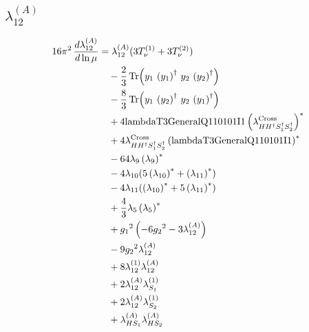 \documentclass[10pt,a4paper]{article}
\begin{document}
\subsection*{$\lambda_{12}^{(A)}$}
\begin{align*}
16\pi^2\,\frac{d \lambda_{12}^{(A)}}{d\ln\mu} &={\lambda_{12}^{(A)}} (3 T_{\nu}^{(1)}+3 T_{\nu}^{(2)}) \\
&\quad -\frac{2}{3} \operatorname{Tr}\!\left({y_1}\,\left({y_1}\right)^{\dagger}\,{y_2}\,\left({y_2}\right)^{\dagger}\right) \\
&\quad -\frac{8}{3} \operatorname{Tr}\!\left({y_1}\,\left({y_2}\right)^{\dagger}\,{y_2}\,\left({y_1}\right)^{\dagger}\right) \\
&\quad +4 \text{lambdaT3GeneralQ110101I1} \left({\lambda_{H H^\dagger S_1^\dagger S_2^\dagger}^{\rm Cross}}\right)^{*} \\
&\quad +4 {\lambda_{H H^\dagger S_1^\dagger S_2^\dagger}^{\rm Cross}} \left(\text{lambdaT3GeneralQ110101I1}\right)^{*} \\
&\quad -64 {\lambda_{9}} \left({\lambda_{9}}\right)^{*} \\
&\quad -4 {\lambda_{10}} (5 \left({\lambda_{10}}\right)^{*}+\left({\lambda_{11}}\right)^{*}) \\
&\quad -4 {\lambda_{11}} (\left({\lambda_{10}}\right)^{*}+5 \left({\lambda_{11}}\right)^{*}) \\
&\quad +\frac{4}{3} {\lambda_5} \left({\lambda_5}\right)^{*} \\
&\quad +{g_1}^2 \left(-6 {g_2}^2-3 {\lambda_{12}^{(A)}}\right) \\
&\quad -9 {g_2}^2 {\lambda_{12}^{(A)}} \\
&\quad +8 {\lambda_{12}^{(1)}} {\lambda_{12}^{(A)}} \\
&\quad +2 {\lambda_{12}^{(A)}} {\lambda_{S_1}^{(1)}} \\
&\quad +2 {\lambda_{12}^{(A)}} {\lambda_{S_2}^{(1)}} \\
&\quad +{\lambda_{HS_1}^{(A)}} {\lambda_{HS_2}^{(A)}} \\
\end{align*}
\end{document}
